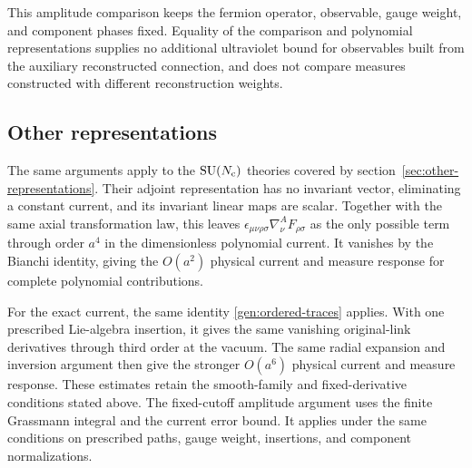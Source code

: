 \documentclass[11pt,a4paper]{article}
\theoremstyle{remark}
\DeclareMathOperator{\SU}{SU}
\begin{document}
This amplitude comparison keeps the fermion operator, observable,
gauge weight, and component phases fixed. Equality of the comparison
and polynomial representations supplies no additional ultraviolet
bound for observables built from the auxiliary reconstructed
connection, and does not compare measures constructed with different
reconstruction weights.

\subsection{Other representations}

The same arguments apply to the $\SU(N_{\rm c})$ theories
covered by section~\ref{sec:other-representations}. Their adjoint
representation has no invariant vector, eliminating a constant
current, and its invariant linear maps are scalar. Together with
the same axial transformation law, this leaves
$\epsilon_{\mu\nu\rho\sigma}\nabla_\nu^A F_{\rho\sigma}$
as the only possible term through order $a^4$ in the
dimensionless polynomial current. It vanishes by the Bianchi
identity, giving the $O(a^2)$ physical current and measure
response for complete polynomial contributions.

For the exact current, the same identity
\eqref{gen:ordered-traces} applies. With one prescribed
Lie-algebra insertion, it gives the same vanishing original-link
derivatives through third order at the vacuum. The same radial expansion
and inversion argument then give the stronger $O(a^6)$
physical current and measure response. These estimates retain the
smooth-family and fixed-derivative conditions stated above. The
fixed-cutoff amplitude argument uses the finite Grassmann integral
and the current error bound. It applies under the same conditions on
prescribed paths, gauge weight, insertions, and component normalizations.



\end{document}
